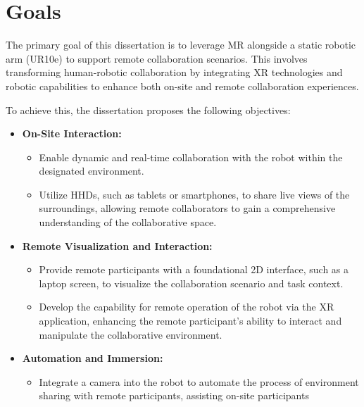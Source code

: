 \section{Goals}
% 
The primary goal of this dissertation is to leverage \ac{MR} alongside a static robotic arm (UR10e) to support remote collaboration scenarios. 
This involves transforming human-robotic collaboration by integrating \ac{XR} technologies and robotic capabilities to enhance both on-site and 
remote collaboration experiences.

To achieve this, the dissertation proposes the following objectives:

\begin{itemize}
    \item \textbf{On-Site Interaction:}
    \begin{itemize}
        \item Enable dynamic and real-time collaboration with the robot within the designated environment.
        \item Utilize \ac{HHDs}, such as tablets or smartphones, to share live views of the surroundings, allowing remote collaborators 
        to gain a comprehensive understanding of the collaborative space.
    \end{itemize}
    \item \textbf{Remote Visualization and Interaction:}
    \begin{itemize}
        \item Provide remote participants with a foundational 2D interface, such as a laptop screen, to visualize the collaboration scenario and 
        task context.
        \item Develop the capability for remote operation of the robot via the \ac{XR} application, enhancing the remote participant's ability to 
        interact and manipulate the collaborative environment.
    \end{itemize}
    \item \textbf{Automation and Immersion:}
    \begin{itemize}
        \item Integrate a camera into the robot to automate the process of environment sharing with remote participants, assisting on-site participants 

\end{itemize}
\end{itemize}
